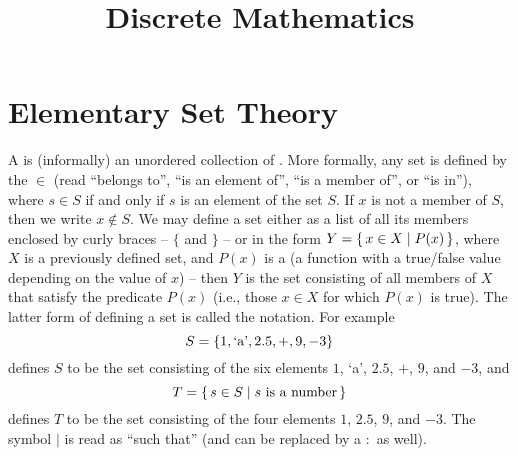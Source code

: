 \title{\textbf{Discrete Mathematics}}

\date{}
\maketitle

\begingroup
\let\clearpage\relax
\tableofcontents
\endgroup

\clearpage

\renewcommand{\nomname}{List of Symbols}
\printnomenclature[10em]

\clearpage

\section{Elementary Set Theory}\label{sec:SetTheory}

A  is (informally) an unordered collection of . More formally, any set is defined by the  $\in$ (read ``belongs to'', ``is an element of'', ``is a member of'', or ``is in''), where $s \in S$ if and only if $s$ is an element of the set $S$. If $x$ is not a member of $S$, then we write $x \notin S$. We may define a set either as a list of all its members enclosed by curly braces -- $\{$ and $\}$ -- or in the form $Y = \qty{\, x \in X \mid P(x) \,}$, where $X$ is a previously defined set, and $P(x)$ is a  (a function with a true/false value depending on the value of $x$) -- then $Y$ is the set consisting of all members of $X$ that satisfy the predicate $P(x)$ (i.e., those $x \in X$ for which $P(x)$ is true). The latter form of defining a set is called the  notation. For example
\begin{equation*}
S = \qty{1, \text{`a'}, 2.5, +, 9, -3}
\end{equation*}
defines $S$ to be the set consisting of the six elements $1$, `a', $2.5$, $+$, $9$, and $-3$, and
\begin{equation*}
T = \qty{\, s \in S \mid s\ \text{is a number} \,}
\end{equation*}
defines $T$ to be the set consisting of the four elements $1$, $2.5$, $9$, and $-3$. The symbol {$|$} is read as ``such that'' (and can be replaced by a $:$ as well).

